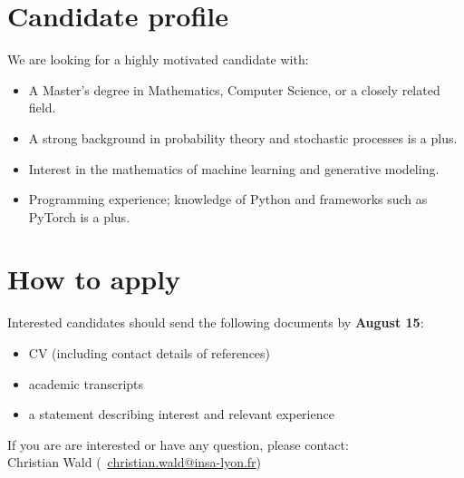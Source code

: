 \documentclass[11pt, a4paper]{article}
\begin{document}
\section*{Candidate profile}

We are looking for a highly motivated candidate with:
\begin{itemize}[label={-}, leftmargin=*]
    \item A Master's degree in Mathematics, Computer Science, or a closely related field.
    \item A strong background in probability theory and stochastic processes is a plus.
    \item Interest in the mathematics of machine learning and generative modeling.
    \item Programming experience; knowledge of Python and frameworks such as PyTorch is a plus.
\end{itemize}

\section*{How to apply}

Interested candidates should send the following documents by \textbf{August 15}:
\begin{itemize}[label={-}, leftmargin=*]
    \item CV (including contact details of references)
    \item academic transcripts
    \item a statement describing interest and relevant experience
\end{itemize}

\vspace{0.5em}
\begin{tcolorbox}[colback=blue!5!white, colframe=blue!40!white, arc=3mm, boxrule=0.5pt, left=10pt, top=6pt, bottom=6pt]
\sffamily
If you are are interested or have any question, please contact: \\
Christian Wald (\faEnvelope\ \href{mailto:christian.wald@insa-lyon.fr}{christian.wald@insa-lyon.fr})
\end{tcolorbox}

\end{document}

